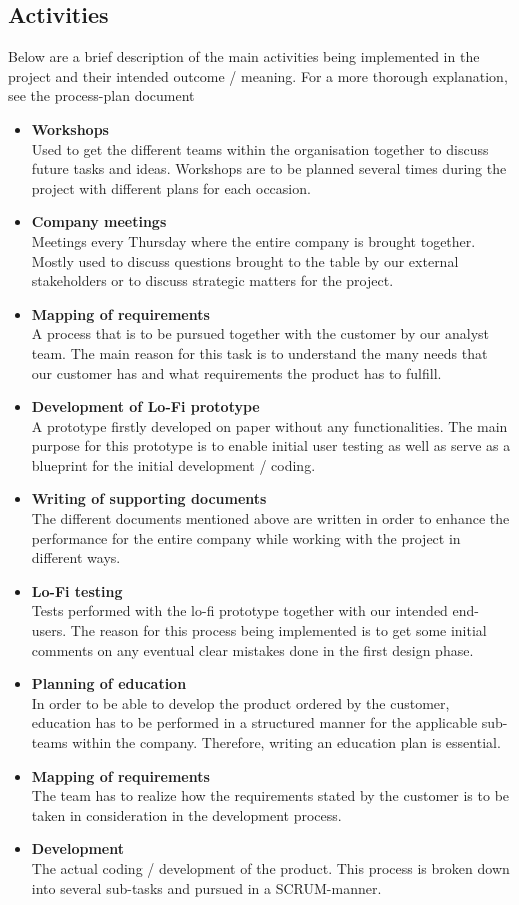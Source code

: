 \subsection{Activities}
Below are a brief description of the main activities being implemented in the project and their intended outcome / meaning. For a more thorough explanation, see the process-plan document 
\begin{itemize}
    \item{\textbf{Workshops}} \\
    Used to get the different teams within the organisation together to discuss future tasks and ideas. Workshops are to be planned several times during the project with different plans for each occasion. 
    \item{\textbf{Company meetings}} \\
    Meetings every Thursday where the entire company is brought together. Mostly used to discuss questions brought to the table by our external stakeholders or to discuss strategic matters for the project. 
    \item{\textbf{Mapping of requirements}} \\
    A process that is to be pursued together with the customer by our analyst team. The main reason for this task is to understand the many needs that our customer has and what requirements the product has to fulfill. 
    \item{\textbf{Development of Lo-Fi prototype}} \\
    A prototype firstly developed on paper without any functionalities. The main purpose for this prototype is to enable initial user testing as well as serve as a blueprint for the initial development / coding. 
    \item{\textbf{Writing of supporting documents}} \\
    The different documents mentioned above are written in order to enhance the performance for the entire company while working with the project in different ways. 
    \item{\textbf{Lo-Fi testing}} \\
    Tests performed with the lo-fi prototype together with our intended end-users. The reason for this process being implemented is to get some initial comments on any eventual clear mistakes done in the first design phase. 
    \item{\textbf{Planning of education}} \\
    In order to be able to develop the product ordered by the customer, education has to be performed in a structured manner for the applicable sub-teams within the company. Therefore, writing an education plan is essential. 
    \item{\textbf{Mapping of requirements}} \\
    The team has to realize how the requirements stated by the customer is to be taken in consideration in the development process. 
    \item{\textbf{Development}} \\
    The actual coding / development of the product. This process is broken down into several sub-tasks and pursued in a SCRUM-manner. 
    

\end{itemize}
